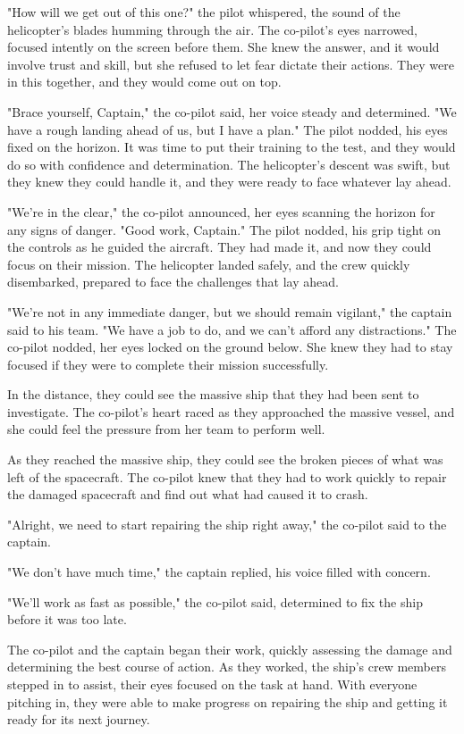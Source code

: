 \documentclass[smalldemyvopaper,11pt,twoside,onecolumn,openright,extrafontsizes]{memoir}
\begin{document}
"How will we get out of this one?" the pilot whispered, the sound of the helicopter's blades humming through the air. The co-pilot's eyes narrowed, focused intently on the screen before them. She knew the answer, and it would involve trust and skill, but she refused to let fear dictate their actions. They were in this together, and they would come out on top.\par
"Brace yourself, Captain," the co-pilot said, her voice steady and determined. "We have a rough landing ahead of us, but I have a plan." The pilot nodded, his eyes fixed on the horizon. It was time to put their training to the test, and they would do so with confidence and determination. The helicopter's descent was swift, but they knew they could handle it, and they were ready to face whatever lay ahead.\par
"We're in the clear," the co-pilot announced, her eyes scanning the horizon for any signs of danger. "Good work, Captain." The pilot nodded, his grip tight on the controls as he guided the aircraft. They had made it, and now they could focus on their mission. The helicopter landed safely, and the crew quickly disembarked, prepared to face the challenges that lay ahead.\par
"We're not in any immediate danger, but we should remain vigilant," the captain said to his team. "We have a job to do, and we can't afford any distractions." The co-pilot nodded, her eyes locked on the ground below. She knew they had to stay focused if they were to complete their mission successfully.\par
In the distance, they could see the massive ship that they had been sent to investigate. The co-pilot's heart raced as they approached the massive vessel, and she could feel the pressure from her team to perform well.\par
As they reached the massive ship, they could see the broken pieces of what was left of the spacecraft. The co-pilot knew that they had to work quickly to repair the damaged spacecraft and find out what had caused it to crash.\par
"Alright, we need to start repairing the ship right away," the co-pilot said to the captain.\par
"We don't have much time," the captain replied, his voice filled with concern.\par
"We'll work as fast as possible," the co-pilot said, determined to fix the ship before it was too late.\par
The co-pilot and the captain began their work, quickly assessing the damage and determining the best course of action. As they worked, the ship's crew members stepped in to assist, their eyes focused on the task at hand. With everyone pitching in, they were able to make progress on repairing the ship and getting it ready for its next journey.\par
\end{document}
